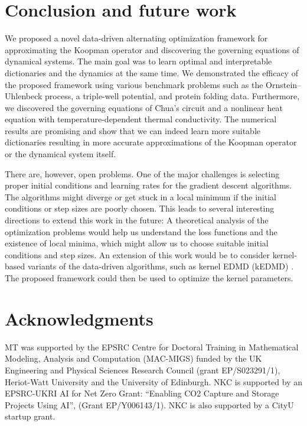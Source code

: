 \documentclass
[
    a4paper,
    DIV=11,
    abstract=true,
    11pt,
]
{scrartcl}
\theoremstyle{definition}
\begin{document}
\section{Conclusion and future work}
\label{sec:conclusion}

We proposed a novel data-driven alternating optimization framework for approximating the Koopman operator and discovering the governing equations of dynamical systems. The main goal was to learn optimal and interpretable dictionaries and the dynamics at the same time. We demonstrated the efficacy of the proposed framework using various benchmark problems such as the Ornstein--Uhlenbeck process, a triple-well potential, and protein folding data. Furthermore, we discovered the governing equations of Chua's circuit and a nonlinear heat equation with temperature-dependent thermal conductivity. The numerical results are promising and show that we can indeed learn more suitable dictionaries resulting in more accurate approximations of the Koopman operator or the dynamical system itself.

There are, however, open problems. One of the major challenges is selecting proper initial conditions and learning rates for the gradient descent algorithms. The algorithms might diverge or get stuck in a local minimum if the initial conditions or step sizes are poorly chosen. This leads to several interesting directions to extend this work in the future: A theoretical analysis of the optimization problems would help us understand the loss functions and the existence of local minima, which might allow us to choose suitable initial conditions and step sizes. An extension of this work would be to consider kernel-based variants of the data-driven algorithms, such as kernel EDMD (kEDMD) \cite{WRK15,KSM20}. The proposed framework could then be used to optimize the kernel parameters.

\section*{Acknowledgments}
MT was supported by the EPSRC Centre for Doctoral Training in Mathematical Modeling, Analysis and Computation (MAC-MIGS) funded by the UK Engineering and Physical Sciences Research Council (grant EP/S023291/1), Heriot-Watt University and the University of Edinburgh. NKC is supported by an EPSRC-UKRI AI for Net Zero Grant: ``Enabling CO2 Capture and Storage Projects Using AI'', (Grant EP/Y006143/1). NKC is also supported by a CityU startup grant.



\end{document}
